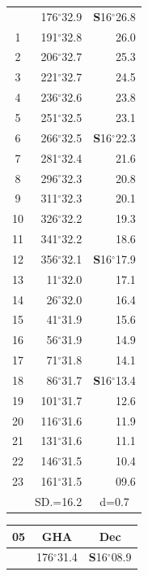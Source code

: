 \documentclass[10pt, a4paper]{report}
\begin{document}
\begin{scriptsize}
\begin{tabular*}{0.2\textwidth}[t]{@{\extracolsep{\fill}}|c|rr|}
\hline\rule{0pt}{2.6ex}\noindent
0 & 176$^\circ$32.9 & \textbf{S}16$^\circ$26.8\\
1 & 191$^\circ$32.8 & 26.0\\
2 & 206$^\circ$32.7 & 25.3\\
3 & 221$^\circ$32.7 & \raisebox{0.24ex}{\boldmath$\cdot$~\boldmath$\cdot$~~}24.5\\
4 & 236$^\circ$32.6 & 23.8\\
5 & 251$^\circ$32.5 & 23.1\\[2Pt]
6 & 266$^\circ$32.5 & \textbf{S}16$^\circ$22.3\\
7 & 281$^\circ$32.4 & 21.6\\
8 & 296$^\circ$32.3 & 20.8\\
9 & 311$^\circ$32.3 & \raisebox{0.24ex}{\boldmath$\cdot$~\boldmath$\cdot$~~}20.1\\
10 & 326$^\circ$32.2 & 19.3\\
11 & 341$^\circ$32.2 & 18.6\\[2Pt]
12 & 356$^\circ$32.1 & \textbf{S}16$^\circ$17.9\\
13 & 11$^\circ$32.0 & 17.1\\
14 & 26$^\circ$32.0 & 16.4\\
15 & 41$^\circ$31.9 & \raisebox{0.24ex}{\boldmath$\cdot$~\boldmath$\cdot$~~}15.6\\
16 & 56$^\circ$31.9 & 14.9\\
17 & 71$^\circ$31.8 & 14.1\\[2Pt]
18 & 86$^\circ$31.7 & \textbf{S}16$^\circ$13.4\\
19 & 101$^\circ$31.7 & 12.6\\
20 & 116$^\circ$31.6 & 11.9\\
21 & 131$^\circ$31.6 & \raisebox{0.24ex}{\boldmath$\cdot$~\boldmath$\cdot$~~}11.1\\
22 & 146$^\circ$31.5 & 10.4\\
23 & 161$^\circ$31.5 & 09.6\\
\hline
\rule{0pt}{2.4ex} & \multicolumn{1}{c}{SD.=16.2} & \multicolumn{1}{c|}{d=0.7}\\
\hline
\end{tabular*}\noindent
\begin{tabular*}{0.2\textwidth}[t]{@{\extracolsep{\fill}}|c|rr|}
\hline
\multicolumn{1}{|c|}{\rule{0pt}{2.6ex}\textbf{05}} & \multicolumn{1}{c}{\textbf{GHA}} & \multicolumn{1}{c|}{\textbf{Dec}}\\
\hline\rule{0pt}{2.6ex}\noindent
0 & 176$^\circ$31.4 & \textbf{S}16$^\circ$08.9\\

\end{tabular*}
\end{scriptsize}
\end{document}
